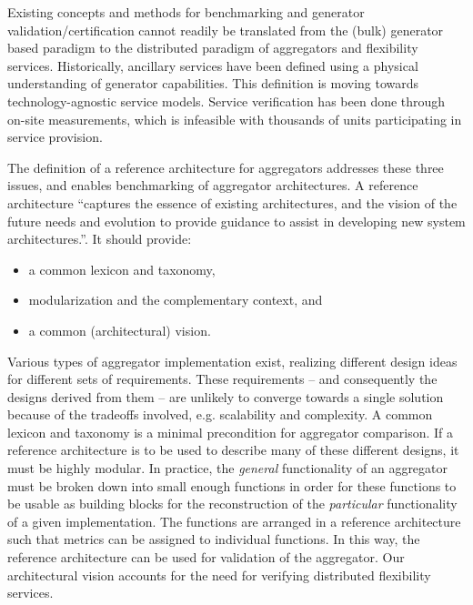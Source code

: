 Existing concepts and methods for benchmarking and generator validation/certification cannot readily be translated from the (bulk) generator based paradigm to the distributed paradigm of aggregators and flexibility services. Historically, ancillary services have been defined using a physical understanding of generator capabilities. This definition is moving towards technology-agnostic service models.
Service verification has been done through on-site measurements, which is infeasible with thousands of units participating in service provision.  

The definition of a reference architecture for aggregators addresses these three issues, and enables benchmarking of aggregator architectures.
A reference architecture ``captures the essence of existing architectures, and the vision of the future needs and evolution to provide guidance to assist in developing new system architectures.''. It should provide: 
\begin{itemize}
\item a common lexicon and taxonomy,
\item modularization and the complementary context, and
\item a common (architectural) vision.
\end{itemize} 

%
%
Various types of aggregator implementation exist, realizing different design ideas for different sets of requirements. These requirements -- and consequently the designs derived from them -- are unlikely to converge towards a single solution because of the tradeoffs involved, e.g. scalability and complexity. A common lexicon and taxonomy is a minimal precondition for aggregator comparison.
If a reference architecture is to be used to describe many of these different designs, it must be highly modular. In practice, the \emph{general} functionality of an aggregator must be broken down into small enough functions in order for these functions to be usable as building blocks for the reconstruction of the \emph{particular} functionality of a given implementation. 
The functions are arranged in a reference architecture such that metrics can be assigned to individual functions. In this way, the reference architecture can be used for validation of the aggregator. Our architectural vision accounts for the need for verifying distributed flexibility services.

